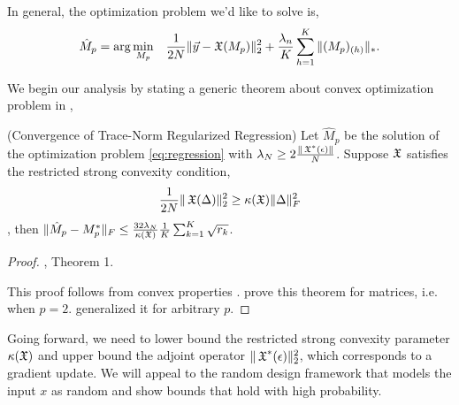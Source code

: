 In general, the optimization problem we'd like to solve is,
\begin{align}
  \hat M_p &= 
  \arg\min_{M_p}& \frac{1}{2N} \| \vec y - \operatorname{\mathfrak{X}}(M_p) \|_2^2 + \frac{\lambda_n}{K} \sum_{h=1}^K \| (M_p)_{(h)} \|_* \label{eq:regression}.
\end{align}

We begin our analysis by stating a generic theorem about convex
optimization problem in , 
\begin{lemma}(Convergence of Trace-Norm Regularized Regression)
  Let $\hat M_p$ be the solution of the optimization problem
  \eqref{eq:regression} with $\lambda_N \ge 2 \frac{\| \operatorname{\mathfrak{X}}^*(\epsilon)
  \|}{N}$. Suppose $\operatorname{\mathfrak{X}}$ satisfies the restricted strong convexity
  condition, $$\frac{1}{2N} \| \operatorname{\mathfrak{X}}( \Delta )\|_2^2 \ge \kappa(\operatorname{\mathfrak{X}})
  \|\Delta\|^2_F$$, then
  $\| \hat M_p - M_p^* \|_F \le \frac{32 \lambda_N}{\kappa(\operatorname{\mathfrak{X}})} \frac{1}{K} \sum_{k=1}^{K} \sqrt{r_k}$.
\end{lemma}
\begin{proof}
  \citet{Tomioka2011}, Theorem 1.

  This proof follows from convex properties .
  \citet{NegahbanWainwright2009} prove this theorem for matrices, i.e.
  when $p = 2$. \citet{Tomioka2011} generalized it for arbitrary $p$.
\end{proof}

Going forward, we need to lower bound the restricted strong convexity
parameter $\kappa(\operatorname{\mathfrak{X}})$ and upper bound the adjoint operator
$\|\operatorname{\mathfrak{X}}^*(\epsilon)\|_{2}^2$, which corresponds to a gradient update. We
will appeal to the random design framework that models the input $x$ as
random and show bounds that hold with high probability.

